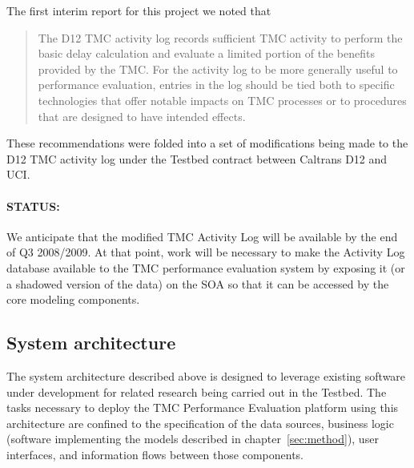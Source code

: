 \documentclass[12pt]{report}
\begin{document}
The first interim report for this project
\citep{rindt08:_measur_based_system_for_tmc_perfor_evaluat}
we noted that
\begin{quote}
  The D12 TMC activity log records sufficient TMC activity to perform
  the basic delay calculation and evaluate a limited portion of the
  benefits provided by the TMC. For the activity log to be more
  generally useful to performance evaluation, entries in the log
  should be tied both to specific technologies that offer notable
  impacts on TMC processes or to procedures that are designed to have
  intended effects.
\end{quote}
These recommendations were folded into a set of modifications being
made to the D12 TMC activity log under the Testbed contract between
Caltrans D12 and UCI.  

\paragraph{STATUS:} We anticipate that the modified TMC Activity Log
will be available by the end of Q3 2008/2009.  At that point, work
will be necessary to make the Activity Log database available to the
TMC performance evaluation system by exposing it (or a shadowed
version of the data) on the SOA so that it can be accessed by the core
modeling components.


\subsection{System architecture}
\label{sec:arch}

The system architecture described above is designed to leverage
existing software under development for related research being carried
out in the Testbed.  The tasks necessary to deploy the TMC Performance
Evaluation platform using this architecture are confined to the
specification of the data sources, business logic (software
implementing the models described in chapter~\ref{sec:method}), user
interfaces, and information flows between those components.









\end{document}
